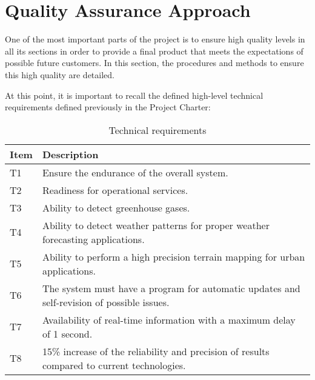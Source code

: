 \section{Quality Assurance Approach}
One of the most important parts of the project is to ensure high quality levels in all its sections in order to provide a final product that meets the expectations of possible future customers. In this section, the procedures and methods to ensure this high quality are detailed. 

At this point, it is important to recall the defined high-level technical requirements defined previously in the Project Charter:
\begin{table}[H]
	\centering
	\begin{tabular}{l p{13.3cm}}
		
		\toprule[2pt]
		
		\textbf{Item} &  \textbf{Description}\\
		
		\midrule [1.5pt]
		
		T1 & Ensure the endurance of the overall system.\vspace{0.2cm}\\
		
		\midrule
		
		T2 & Readiness for operational services.\vspace{0.2cm}\\
		
		\midrule
		
		T3 & Ability to detect greenhouse gases.\vspace{0.2cm}\\
		
		\midrule
		
		T4 & Ability to detect weather patterns for proper weather forecasting applications.\vspace{0.2cm}\\
		
		\midrule
		
		T5 & Ability to perform a high precision terrain mapping for urban applications.\vspace{0.2cm}\\
		
		\midrule
		
		T6 & The system must have a program for automatic updates and self-revision of possible issues.\vspace{0.2cm}\\
		
		\midrule
		
		T7 & Availability of real-time information with a maximum delay of 1 second.\vspace{0.2cm}\\
		
		\midrule
		
		T8 & 15\% increase of the reliability and precision of results compared to current technologies.\vspace{0.2cm}\\
		
		\bottomrule[2pt]
		
	\end{tabular}
	\caption{Technical requirements}
\end{table}

